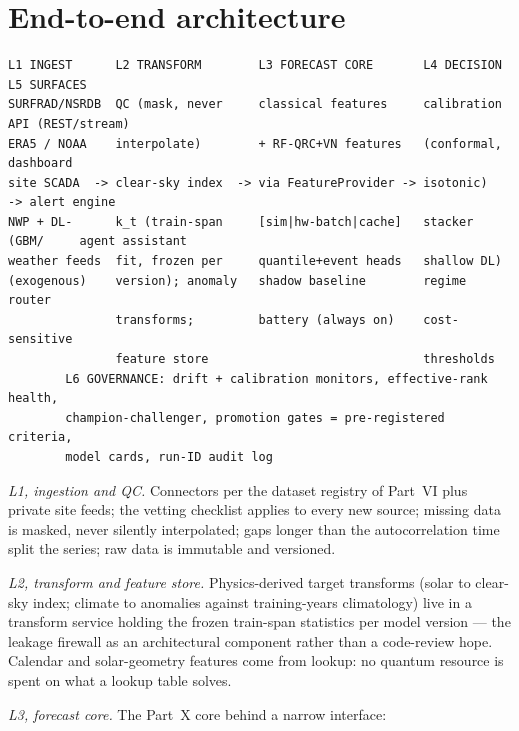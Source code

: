 \section{End-to-end architecture}
\label{sec:prod-arch}

\begin{strip}
\begin{lstlisting}[language={},basicstyle=\ttfamily\scriptsize,caption={Six-layer architecture. L6 governance spans the whole pipeline.},label={lst:prod-layers}]
L1 INGEST      L2 TRANSFORM        L3 FORECAST CORE       L4 DECISION       L5 SURFACES
SURFRAD/NSRDB  QC (mask, never     classical features     calibration       API (REST/stream)
ERA5 / NOAA    interpolate)        + RF-QRC+VN features   (conformal,       dashboard
site SCADA  -> clear-sky index  -> via FeatureProvider -> isotonic)      -> alert engine
NWP + DL-      k_t (train-span     [sim|hw-batch|cache]   stacker (GBM/     agent assistant
weather feeds  fit, frozen per     quantile+event heads   shallow DL)
(exogenous)    version); anomaly   shadow baseline        regime router
               transforms;         battery (always on)    cost-sensitive
               feature store                              thresholds
        L6 GOVERNANCE: drift + calibration monitors, effective-rank health,
        champion-challenger, promotion gates = pre-registered criteria,
        model cards, run-ID audit log
\end{lstlisting}
\end{strip}

\emph{L1, ingestion and QC.} Connectors per the dataset registry of
Part~VI plus private site feeds; the vetting checklist applies to every new
source; missing data is masked, never silently interpolated; gaps longer
than the autocorrelation time split the series; raw data is immutable and
versioned.

\emph{L2, transform and feature store.} Physics-derived target transforms
(solar to clear-sky index; climate to anomalies against training-years
climatology) live in a transform service holding the frozen train-span
statistics per model version --- the leakage firewall as an architectural
component rather than a code-review hope. Calendar and solar-geometry
features come from lookup: no quantum resource is spent on what a lookup
table solves.

\emph{L3, forecast core.} The Part~X core behind a narrow interface:

